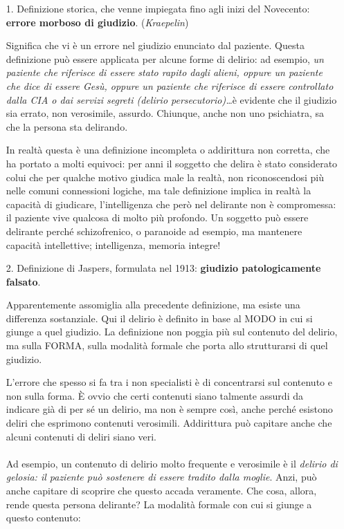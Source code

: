 \begin{itemize}
\item[1.]
  Definizione storica, che venne impiegata fino agli inizi del
  Novecento: \textbf{errore morboso di giudizio}. (\emph{Kraepelin})

Significa che vi è un errore nel giudizio enunciato dal paziente. Questa
definizione può essere applicata per alcune forme di delirio: ad
esempio, \emph{un paziente che riferisce di essere stato rapito dagli
alieni, oppure un paziente che dice di essere Gesù, oppure un paziente
che riferisce di essere controllato dalla CIA o dai servizi segreti
(delirio persecutorio)\ldots{}}è evidente che il giudizio sia errato,
non verosimile, assurdo. Chiunque, anche non uno psichiatra, sa che la
persona sta delirando.

In realtà questa è una definizione incompleta o addirittura non
corretta, che ha portato a molti equivoci: per anni il soggetto che
delira è stato considerato colui che per qualche motivo giudica male la
realtà, non riconoscendosi più nelle comuni connessioni logiche, ma tale
definizione implica in realtà la capacità di giudicare, l'intelligenza
che però nel delirante non è compromessa: il paziente vive qualcosa di
molto più profondo. Un soggetto può essere delirante perché
schizofrenico, o paranoide ad esempio, ma mantenere capacità
intellettive; intelligenza, memoria integre!

\item[2.]
  Definizione di Jaspers, formulata nel 1913: \textbf{giudizio
  patologicamente falsato}.

Apparentemente assomiglia alla precedente definizione, ma esiste una
differenza sostanziale. Qui il delirio è definito in base al MODO in cui
si giunge a quel giudizio. La definizione non poggia più sul contenuto
del delirio, ma sulla FORMA, sulla modalità formale che porta allo
strutturarsi di quel giudizio.

L'errore che spesso si fa tra i non specialisti è di concentrarsi sul
contenuto e non sulla forma. È ovvio che certi contenuti siano talmente
assurdi da indicare già di per sé un delirio, ma non è sempre così,
anche perché esistono deliri che esprimono contenuti verosimili.
Addirittura può capitare anche che alcuni contenuti di deliri siano
veri.
\\\\
Ad esempio, un contenuto di delirio molto frequente e verosimile è il
\emph{delirio di gelosia: il paziente può sostenere di essere tradito
dalla moglie}. Anzi, può anche capitare di scoprire che questo accada
veramente. Che cosa, allora, rende questa persona delirante? La modalità
formale con cui si giunge a questo contenuto:


\end{itemize}
